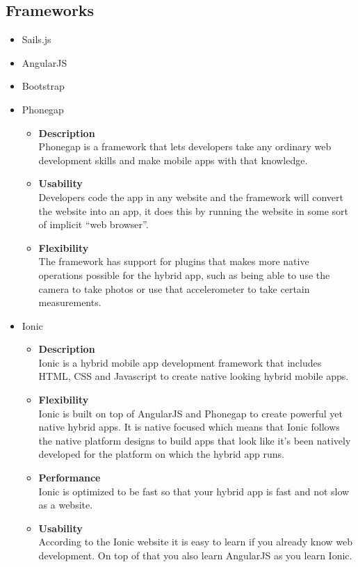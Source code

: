 \documentclass[11pt,fleqn]{book} %
\begin{document}
	\subsection{Frameworks}
	\begin{itemize}
		\item Sails.js
		\item AngularJS
		\item Bootstrap
		\item Phonegap
		\begin{itemize}
			\item \textbf{Description}\\
			Phonegap is a framework that lets developers take any ordinary web development skills and make mobile apps with that knowledge.
			\item \textbf{Usability}\\
			Developers code the app in any website and the framework will convert the website into an app, it does this by running the website in some sort of implicit “web browser”.
			\item \textbf{Flexibility}\\
			The framework has support for plugins that makes more native operations possible for the hybrid app, such as being able to use the camera to take photos or use that accelerometer to take certain measurements.
		\end{itemize}
		\item Ionic
		\begin{itemize}
			\item \textbf{Description}\\
			Ionic is a hybrid mobile app development framework that includes HTML, CSS and Javascript to create native looking hybrid mobile apps.
			\item \textbf{Flexibility}\\
			Ionic is built on top of AngularJS and Phonegap to create powerful yet native hybrid apps. It is native focused which means that Ionic follows the native platform designs to build apps that look like it’s been natively developed for the platform on which the hybrid app runs.
			\item \textbf{Performance}\\
			Ionic is optimized to be fast so that your hybrid app is fast and not slow as a website.
			\item \textbf{Usability}\\
			According to the Ionic website it is easy to learn if you already know web development. On top of that you also learn AngularJS as you learn Ionic.
		\end{itemize}
	\end{itemize}
\end{document}

